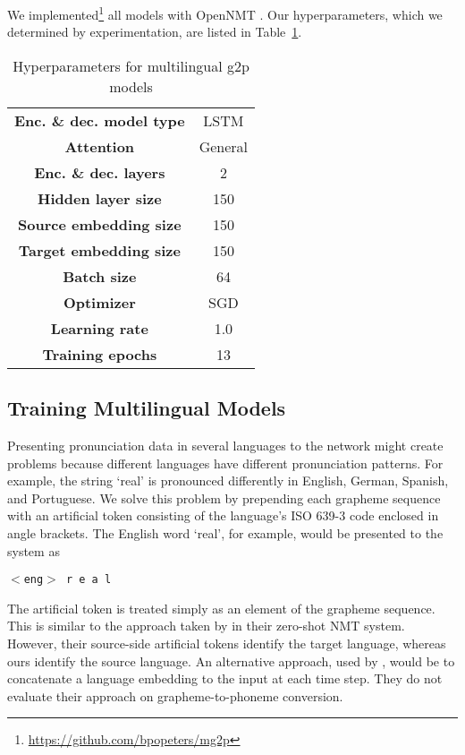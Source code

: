 \documentclass[11pt,letterpaper]{article}
\begin{document}
We implemented\footnote{\url{https://github.com/bpopeters/mg2p}} all models with OpenNMT \cite{2017opennmt}. Our hyperparameters, which we determined by experimentation, are listed in Table~\ref{table:hyperparameters}.

\begin{table}
\centering
\small
\begin{tabular}{|c|c|}
\hline
\textbf{Enc. \& dec. model type} & LSTM \\
\textbf{Attention} & General \\
\textbf{Enc. \& dec. layers} & 2 \\
\textbf{Hidden layer size} & 150 \\
\textbf{Source embedding size} & 150 \\
\textbf{Target embedding size} & 150 \\
\textbf{Batch size} & 64 \\
\textbf{Optimizer} & SGD \\
\textbf{Learning rate} & 1.0 \\
\textbf{Training epochs} & 13 \\
\hline

\end{tabular}
\caption{Hyperparameters for multilingual g2p models}
\label{table:hyperparameters}
\end{table}

\subsection{Training Multilingual Models}
Presenting pronunciation data in several languages to the network might create problems because different languages have different pronunciation patterns.  For example, the string `real' is pronounced differently in English, German, Spanish, and Portuguese. We solve this problem by prepending each grapheme sequence with an artificial token consisting of the language's ISO 639-3 code enclosed in angle brackets. The English word `real', for example, would be presented to the system as
\begin{center}
\texttt{$<$eng$>$ r e a l}
\end{center}
The artificial token is treated simply as an element of the grapheme sequence. This is similar to the approach taken by  in their zero-shot NMT system. However, their source-side artificial tokens identify the target language, whereas ours identify the source language. An alternative approach, used by , would be to concatenate a language embedding to the input at each time step. They do not evaluate their approach on grapheme-to-phoneme conversion.
\end{document}
